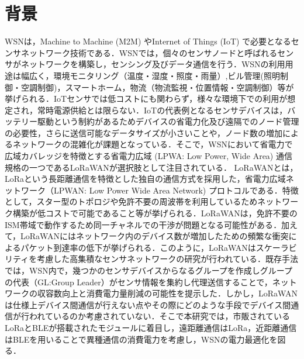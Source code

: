 \section{背景}
WSNは，Machine to Machine (M2M) やInternet of Things (IoT) で必要となるセンサネットワーク技術である．WSNでは，個々のセンサノードと呼ばれるセンサがネットワークを構築し，センシング及びデータ通信を行う．WSNの利用用途は幅広く，環境モニタリング（温度・湿度・照度・雨量）,ビル管理(照明制御・空調制御)，スマートホーム，物流（物流監視・位置情報・空調制御）等が挙げられる\cite{Farooq2018}．IoTセンサでは低コストにも関わらず，様々な環境下での利用が想定され，常時電源供給とは限らない．IoTの代表例となるセンサデバイスは，バッテリー駆動という制約があるためデバイスの省電力化及び遠隔でのノード管理の必要性，さらに送信可能なデータサイズが小さいことや，ノード数の増加によるネットワークの混雑化が課題となっている．そこで，WSNにおいて省電力で広域カバレッジを特徴とする省電力広域 (LPWA: Low Power, Wide Area) 通信規格の一つであるLoRaWANが選択肢として注目されている．
LoRaWANとは，LoRaという長距離通信を特徴とした独自の通信方式を採用した，省電力広域ネットワーク（LPWAN: Low Power Wide Area Network) プロトコルである．特徴として，スター型のトポロジや免許不要の周波帯を利用しているためネットワーク構築が低コストで可能であること等が挙げられる．LoRaWANは，免許不要のISM帯域で動作するため同一チャネルでの干渉が問題となる可能性がある\cite{Adelantado2017}．加えて，LoRaWANにはネットワーク内のデバイス数が増加したための頻繁な衝突によるパケット到達率の低下が挙げられる．このように，LoRaWANはスケーラビリティを考慮した高集積なセンサネットワークの研究が行われている．既存手法では，WSN内で，幾つかのセンサデバイスからなるグループを作成しグループの代表（GL:Group Leader）がセンサ情報を集約し代理送信することで，ネットワークの収容数向上と消費電力量削減の可能性を提示した．しかし，LoRaWANは仕様上デバイス間通信が行えない点やその際にどのような手段でデバイス間通信が行われているのか考慮されていない．そこで本研究では，市販されているLoRaとBLEが搭載されたモジュールに着目し，遠距離通信はLoRa，近距離通信はBLEを用いることで異種通信の消費電力を考慮し，WSNの電力最適化を図る．

